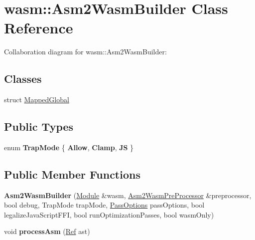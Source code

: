 \hypertarget{classwasm_1_1_asm2_wasm_builder}{}\section{wasm\+:\+:Asm2\+Wasm\+Builder Class Reference}
\label{classwasm_1_1_asm2_wasm_builder}


Collaboration diagram for wasm\+:\+:Asm2\+Wasm\+Builder\+:
\subsection*{Classes}
\begin{DoxyCompactItemize}
\item 
struct \mbox{\hyperlink{structwasm_1_1_asm2_wasm_builder_1_1_mapped_global}{Mapped\+Global}}
\end{DoxyCompactItemize}
\subsection*{Public Types}
\begin{DoxyCompactItemize}
\item 
\mbox{\label{classwasm_1_1_asm2_wasm_builder_a15d4783ab2d996daf6c54f67aa71ea55}} 
enum {\bfseries Trap\+Mode} \{ {\bfseries Allow}, 
{\bfseries Clamp}, 
{\bfseries JS}
 \}
\end{DoxyCompactItemize}
\subsection*{Public Member Functions}
\begin{DoxyCompactItemize}
\item 
\mbox{\label{classwasm_1_1_asm2_wasm_builder_a7cf11c4f62fe7c7e7f2710af2d94dac4}} 
{\bfseries Asm2\+Wasm\+Builder} (\mbox{\hyperlink{classwasm_1_1_module}{Module}} \&wasm, \mbox{\hyperlink{structwasm_1_1_asm2_wasm_pre_processor}{Asm2\+Wasm\+Pre\+Processor}} \&preprocessor, bool debug, Trap\+Mode trap\+Mode, \mbox{\hyperlink{structwasm_1_1_pass_options}{Pass\+Options}} pass\+Options, bool legalize\+Java\+Script\+F\+FI, bool run\+Optimization\+Passes, bool wasm\+Only)
\item 
\mbox{\label{classwasm_1_1_asm2_wasm_builder_a80befde399f69b4a1ebcad23abcca270}} 
void {\bfseries process\+Asm} (\mbox{\hyperlink{structcashew_1_1_ref}{Ref}} ast)
\end{DoxyCompactItemize}
